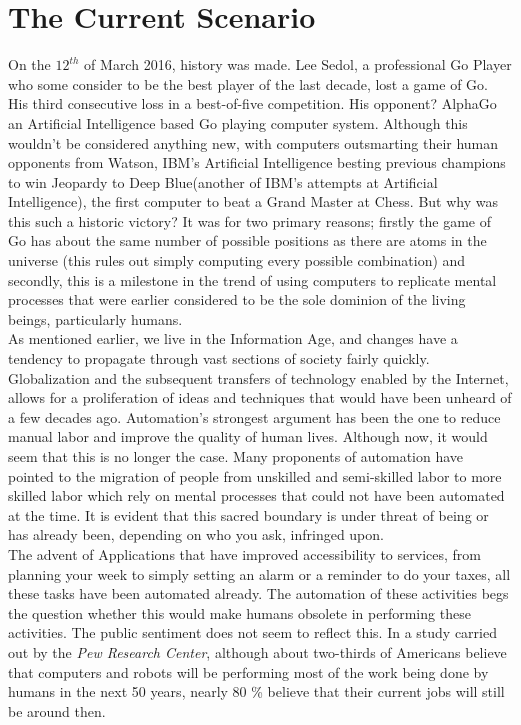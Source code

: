 \section{The Current Scenario}
\label{sec:-current}
On the $12^{th}$ of March 2016, history was made. Lee Sedol, a professional Go Player who some consider to be the best player of the last decade, lost a game of Go. His third consecutive loss in a best-of-five competition. His opponent? AlphaGo an Artificial Intelligence based Go playing computer system\cite{alphagolee}. Although this wouldn't be considered anything new, with computers outsmarting their human opponents from Watson, IBM's Artificial Intelligence besting previous champions to win Jeopardy\cite{watsonjeopardy} to Deep Blue(another of IBM's attempts at Artificial Intelligence), the first computer to beat a Grand Master at Chess. But why was this such a historic victory? It was for two primary reasons; firstly the game of Go has about the same number of possible positions as there are atoms in the universe (this rules out simply computing every possible combination) and secondly, this is a milestone in the trend of using computers to replicate mental processes that were earlier considered to be the sole dominion of the living beings, particularly humans.\\
As mentioned earlier, we live in the Information Age, and changes have a tendency to propagate through vast sections of society fairly quickly. Globalization and the subsequent transfers of technology enabled by the Internet, allows for a proliferation of ideas and techniques that would have been unheard of a few decades ago. Automation's strongest argument has been the one to reduce manual labor and improve the quality of human lives. Although now, it would seem that this is no longer the case. Many proponents of automation have pointed to the migration of people from unskilled and semi-skilled labor to more skilled labor which rely on mental processes that could not have been automated at the time. It is evident that this sacred boundary is under threat of being or has already been, depending on who you ask, infringed upon.\\
	The advent of Applications that have improved accessibility to services, from planning your week to simply setting an alarm or a reminder to do your taxes, all these tasks have been automated already. The automation of these activities begs the question whether this would make humans obsolete in performing these activities. The public sentiment does not seem to reflect this. In a study carried out by the \textit{Pew Research Center}\cite{workforcepew}, although about two-thirds of Americans believe that computers and robots will be performing most of the work being done by humans in the next 50 years, nearly 80 \% believe that their current jobs will still be around then.\\
